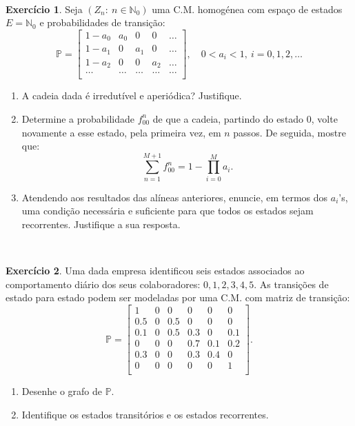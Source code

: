 \documentclass[
  11pt,
  a4paper,
]{book}
\theoremstyle{definition}
\theoremstyle{definition}
\theoremstyle{definition}
\newtheorem{exercise}{Exercício}[chapter]
\theoremstyle{definition}
\theoremstyle{remark}
\begin{document}
\(\,\)

\begin{exercise}

Seja \((Z_n: ~n \in \mathbb{N}_0)\) uma C.M. homogénea com espaço de estados \(E=\mathbb{N}_0\) e probabilidades de transição:
\[\mathbb{P}= \begin{bmatrix}
    1-a_0 & a_0 & 0 & 0  & \dots  \\
    1-a_1 & 0 & a_1 & 0  & \dots  \\
    1-a_2 & 0 & 0 & a_2  & \dots  \\
    \dots & \dots & \dots & \dots  & \dots  \\
\end{bmatrix}, \quad 0<a_i<1, ~i=0,1,2,\dots\]

\begin{enumerate}
\def\labelenumi{(\alph{enumi})}
\item
  A cadeia dada é irredutível e aperiódica? Justifique.
\item
  Determine a probabilidade \(f_{00}^n\) de que a cadeia, partindo do estado 0, volte novamente a esse estado, pela primeira vez, em \(n\) passos. De seguida, mostre que:
  \[\sum\limits_{n=1}^{M+1}f_{00}^n=1-\prod\limits_{i=0}^{M}a_i.\]
\item
  Atendendo aos resultados das alíneas anteriores, enuncie, em termos dos \(a_i\)'s, uma condição necessária e suficiente para que todos os estados sejam recorrentes. Justifique a sua resposta.
\end{enumerate}

\end{exercise}

\(\,\)

\begin{exercise}

Uma dada empresa identificou seis estados associados ao comportamento diário dos seus colaboradores: \(0,1,2,3,4,5\). As transições de estado para estado podem ser modeladas por uma C.M. com matriz de transição:
\[\mathbb{P}= \begin{bmatrix}
    1 & 0 & 0 & 0 & 0 & 0  \\
    0.5 & 0 & 0.5 & 0 & 0 & 0  \\
    0.1 & 0 & 0.5 & 0.3 & 0 & 0.1  \\
    0 & 0 & 0 & 0.7 & 0.1 & 0.2  \\
    0.3 & 0 & 0 & 0.3 & 0.4 & 0  \\
    0 & 0 & 0 & 0 & 0 & 1  \\
\end{bmatrix}.\]

\begin{enumerate}
\def\labelenumi{(\alph{enumi})}
\item
  Desenhe o grafo de \(\mathbb{P}\).
\item
  Identifique os estados transitórios e os estados recorrentes.
\end{enumerate}

\end{exercise}
\end{document}
